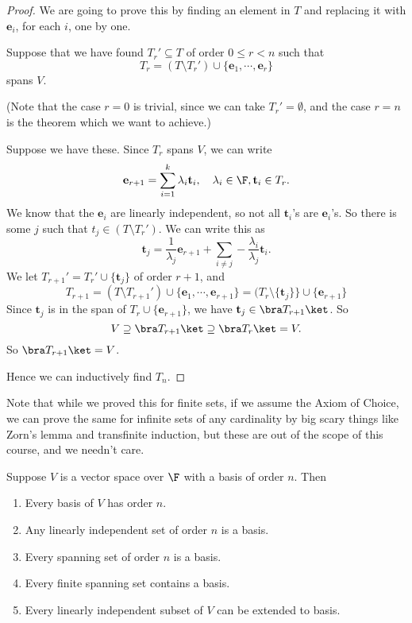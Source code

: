 \documentclass[a4paper]{article}
\begin{document}
\begin{proof}
  We are going to prove this by finding an element in $T$ and replacing it with $\mathbf{e}_i$, for each $i$, one by one.

  Suppose that we have found $T_r'\subseteq T$ of order $0 \leq r < n$ such that
  \[
    T_r = (T\setminus T_r') \cup \{\mathbf{e}_1, \cdots, \mathbf{e}_r\}
  \]
  spans $V$.

  (Note that the case $r = 0$ is trivial, since we can take $T_r' = \emptyset$, and the case $r = n$ is the theorem which we want to achieve.)

  Suppose we have these. Since $T_r$ spans $V$, we can write
  \[
    \mathbf{e}_{r + 1} = \sum_{i = 1}^k \lambda_i \mathbf{t}_i,\quad \lambda_i \in \F, \mathbf{t}_i \in T_r.
  \]
  We know that the $\mathbf{e}_i$ are linearly independent, so not all $\mathbf{t}_i$'s are $\mathbf{e}_i$'s. So there is some $j$ such that $t_j \in (T\setminus T_r')$. We can write this as
  \[
    \mathbf{t}_j = \frac{1}{\lambda_j} \mathbf{e}_{r + 1} + \sum_{i \not= j} -\frac{\lambda_i}{\lambda_j} \mathbf{t}_i.
  \]
  We let $T_{r + 1}' = T_r' \cup \{\mathbf{t}_j\}$ of order $r + 1$, and
  \[
    T_{r + 1} = (T\setminus T_{r + 1}') \cup \{\mathbf{e}_1, \cdots, \mathbf{e}_{r + 1}\} = (T_r \setminus \{\mathbf{t}_j\}\} \cup \{\mathbf{e}_{r + 1}\}
  \]
  Since $\mathbf{t}_j$ is in the span of $T_r\cup \{\mathbf{e}_{r + 1}\}$, we have $\mathbf{t}_j \in \bra T_{r + 1}\ket$. So
  \[
    V \supseteq \bra T_{r + 1}\ket \supseteq \bra T_r \ket = V.
  \]
  So $\bra T_{r + 1}\ket = V$.

  Hence we can inductively find $T_n$.
\end{proof}
Note that while we proved this for finite sets, if we assume the Axiom of Choice, we can prove the same for infinite sets of any cardinality by big scary things like Zorn's lemma and transfinite induction, but these are out of the scope of this course, and we needn't care.

\begin{cor}
  Suppose $V$ is a vector space over $\F$ with a basis of order $n$. Then
  \begin{enumerate}
    \item Every basis of $V$ has order $n$.
    \item Any linearly independent set of order $n$ is a basis.
    \item Every spanning set of order $n$ is a basis.
    \item Every finite spanning set contains a basis.
    \item Every linearly independent subset of $V$ can be extended to basis.
  \end{enumerate}
\end{cor}
\end{document}
